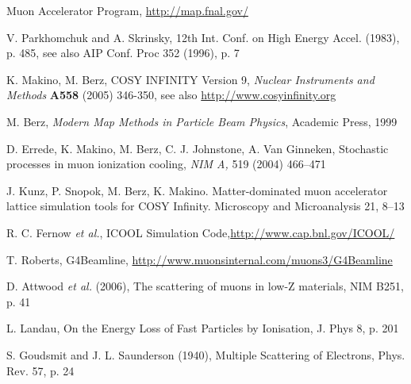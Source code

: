 \documentclass[a4paper,11pt]{article}
\begin{document}








\begin{thebibliography}{9}

Muon Accelerator Program, \url{http://map.fnal.gov/}

V. Parkhomchuk and A. Skrinsky, 12th Int. Conf. on High Energy Accel. (1983), p. 485, see also AIP Conf. Proc 352 (1996), p. 7 

K. Makino, M. Berz, COSY INFINITY Version 9, \emph{Nuclear Instruments and Methods} \textbf{A558} (2005) 346-350, see also \url{http://www.cosyinfinity.org}

M. Berz, \emph{Modern Map Methods in Particle Beam Physics}, Academic Press, 1999

D. Errede, K. Makino, M. Berz, C. J. Johnstone, A. Van Ginneken, Stochastic processes in muon ionization cooling, \emph {NIM A,} 519 (2004) 466--471

J. Kunz, P. Snopok, M. Berz, K. Makino. Matter-dominated muon accelerator lattice simulation tools for COSY Infinity. Microscopy and Microanalysis 21, 8--13

R. C. Fernow \emph{et al.}, ICOOL Simulation Code,\url{http://www.cap.bnl.gov/ICOOL/}

T. Roberts, G4Beamline, \url{http://www.muonsinternal.com/muons3/G4Beamline}

D. Attwood \emph{et al.} (2006), The scattering of muons in low-Z materials, NIM B251, p. 41

L. Landau, On the Energy Loss of Fast Particles by Ionisation, J. Phys 8, p. 201

S. Goudsmit and J. L. Saunderson (1940), Multiple Scattering of Electrons, Phys. Rev. 57, p. 24


\end{thebibliography}
\end{document}
